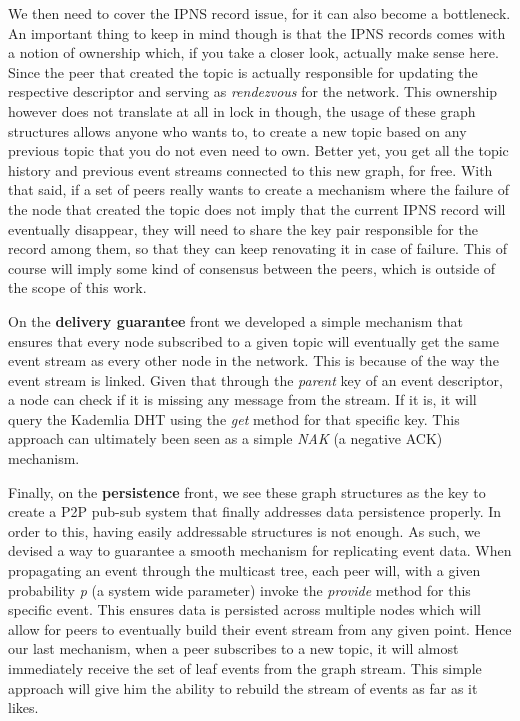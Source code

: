 We then need to cover the IPNS record issue, for it can also become a
bottleneck. An important thing to keep in mind though is that the IPNS
records comes with a notion of ownership which, if you take a closer
look, actually make sense here. Since the peer that created the topic is
actually responsible for updating the respective descriptor and serving
as \emph{rendezvous} for the network. This ownership however does not
translate at all in lock in though, the usage of these graph structures
allows anyone who wants to, to create a new topic based on any previous
topic that you do not even need to own. Better yet, you get all the
topic history and previous event streams connected to this new graph,
for free. With that said, if a set of peers really wants to create a
mechanism where the failure of the node that created the topic does not
imply that the current IPNS record will eventually disappear, they will
need to share the key pair responsible for the record among them, so
that they can keep renovating it in case of failure. This of course will
imply some kind of consensus between the peers, which is outside of the
scope of this work.

On the \textbf{delivery guarantee} front we developed a simple mechanism
that ensures that every node subscribed to a given topic will eventually
get the same event stream as every other node in the network. This is
because of the way the event stream is linked. Given that through the
\emph{parent} key of an event descriptor, a node can check if it is
missing any message from the stream. If it is, it will query the
Kademlia DHT using the \emph{get} method for that specific key. This
approach can ultimately been seen as a simple \emph{NAK} (a negative
ACK) mechanism.

Finally, on the \textbf{persistence} front, we see these graph
structures as the key to create a P2P pub-sub system that finally
addresses data persistence properly. In order to this, having easily
addressable structures is not enough. As such, we devised a way to
guarantee a smooth mechanism for replicating event data. When
propagating an event through the multicast tree, each peer will, with a
given probability \emph{p} (a system wide parameter) invoke the
\emph{provide} method for this specific event. This ensures data is
persisted across multiple nodes which will allow for peers to eventually
build their event stream from any given point. Hence our last mechanism,
when a peer subscribes to a new topic, it will almost immediately
receive the set of leaf events from the graph stream. This simple
approach will give him the ability to rebuild the stream of events as
far as it likes.
